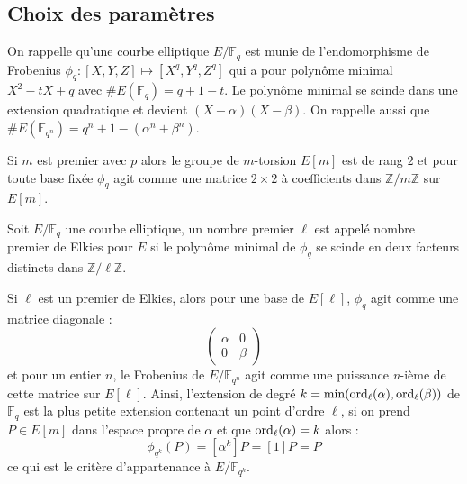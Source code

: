 \documentclass[a4paper]{article} %
\numberwithin{section}{part}
\numberwithin{equation}{section}
\newcommand\nroot[1]{\textit{#1}-ième}
\newcommand\zmodn[1]{\mathbb{Z}/#1\mathbb{Z}}
\newcommand\GF[1]{\mathbb{F}_{#1}}
\newcommand\ord[2]{\textup{ord}_{#1}(#2)}
\begin{document}
\subsection{Choix des paramètres}
\label{sec:choixparam}
On rappelle qu'une courbe elliptique $E/\GF{q}$ est munie de l'endomorphisme de
Frobenius $\phi_q : [X, Y, Z] \mapsto [X^q, Y^q, Z^q]$ qui a pour polynôme
minimal $X^2 -tX + q$ avec $\#E(\GF{q}) = q + 1 - t$. Le polynôme
minimal se scinde dans une extension quadratique et devient $(X -
\alpha)(X - \beta)$. On rappelle aussi que $\#E(\GF{q^n}) = q^n + 1 - (\alpha^n
+ \beta^n)$.\par
Si $m$ est premier avec $p$ alors le groupe de $m$-torsion $E[m]$ est de rang
$2$ et pour toute base fixée $\phi_q$ agit comme une matrice $2\times2$ à
coefficients dans $\zmodn{m}$ sur $E[m]$.
\begin{defn}
Soit $E/\GF{q}$ une courbe elliptique, un nombre premier $\ell$ est appelé
nombre premier de Elkies pour $E$ si le polynôme minimal de $\phi_q$ se scinde
en deux facteurs distincts dans $\zmodn{\ell}$.
\end{defn}
Si $\ell$ est un premier de Elkies, alors pour une base de $E[\ell]$, $\phi_q$
agit comme une matrice diagonale :
\begin{equation}
\begin{pmatrix}
\alpha & 0\\
0 & \beta
\end{pmatrix}
\end{equation}
et pour un entier $n$, le Frobenius de $E/\GF{q^n}$ agit comme une puissance
\nroot{n} de cette matrice sur $E[\ell]$. Ainsi, l'extension de degré
$k = \textup{min}(\ord{\ell}{\alpha},\ord{\ell}{\beta})$ de 
$\GF{q}$ est la plus petite extension contenant un point d'ordre $\ell$, si on
prend $P\in E[m]$ dans l'espace propre de $\alpha$  et que $\ord{\ell}{\alpha} =
k$ alors :
\begin{equation}
\phi_{q^k}(P) = [\alpha^k]P = [1]P = P
\end{equation}
ce qui est le critère d'appartenance à $E/\GF{q^k}$.
\end{document}

